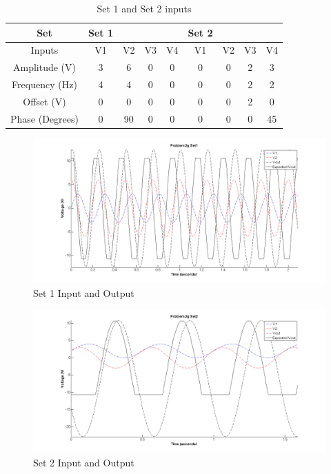 \documentclass{article}
\theoremstyle{plain}
\theoremstyle{definition}
\theoremstyle{remark}
\begin{document}
\begin{table}
\begin{center}
    \begin{tabular}{|c|c|c|c|c|c|c|c|c|}
        \hline
        Set       & Set 1 & ~  & ~  & ~  & Set 2 & ~  & ~  & ~  \\ \hline
        Inputs    & V1    & V2 & V3 & V4 & V1    & V2 & V3 & V4 \\ 
        Amplitude (V) & 3     & 6  & 0  & 0  & 0     & 0  & 2  & 3  \\ 
        Frequency (Hz) & 4     & 4  & 0  & 0  & 0     & 0  & 2  & 2  \\ 
        Offset    (V) & 0     & 0  & 0  & 0  & 0     & 0  & 2  & 0  \\ 
        Phase     (Degrees) & 0     & 90 & 0  & 0  & 0     & 0  & 0  & 45 \\
        \hline
    \end{tabular}
\end{center}
\caption{Set 1 and Set 2 inputs}
\label{q2_gt1}
\end{table}



\begin{figure}[hbt]
\begin{center}
\includegraphics[width = 15cm]{problem2g_set1.png}
\caption{Set 1 Input and Output}
\label{q2_gf1}
\end{center}
\end{figure}

\begin{figure}[hbt]
\begin{center}
\includegraphics[width = 15cm]{problem2g_set2.png}
\caption{Set 2 Input and Output}
\label{q2_gf2}
\end{center}
\end{figure}
\end{document}
